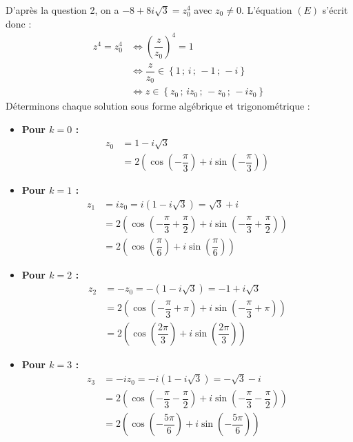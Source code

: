 \documentclass[12pt,a4paper]{article}
\begin{document}
\begin{enumerate}
    D'après la question 2, on a $-8 + 8i\sqrt{3} = z_0^4$ avec $z_0 \neq 0$. L'équation $(E)$ s'écrit donc :
    $$
    \begin{aligned}
        z^4 = z_0^4 &\iff \left(\dfrac{z}{z_0}\right)^4 = 1 \\
        &\iff \dfrac{z}{z_0} \in \left\{ 1 \,;\, i \,;\, -1 \,;\, -i \right\} \\
        &\iff z \in \left\{ z_0 \,;\, iz_0 \,;\, -z_0 \,;\, -iz_0 \right\}
    \end{aligned}
    $$
    Déterminons chaque solution sous forme algébrique et trigonométrique :
    \begin{itemize}
        \item \textbf{Pour $k = 0$ :}
        $$
        \begin{aligned}
            z_0 &= 1 - i\sqrt{3} \\
            &= 2\left(\cos\left(-\dfrac{\pi}{3}\right) + i\sin\left(-\dfrac{\pi}{3}\right)\right)
        \end{aligned}
        $$
        \item \textbf{Pour $k = 1$ :}
        $$
        \begin{aligned}
            z_1 &= iz_0 = i(1 - i\sqrt{3}) = \sqrt{3} + i \\
            &= 2\left(\cos\left(-\dfrac{\pi}{3} + \dfrac{\pi}{2}\right) + i\sin\left(-\dfrac{\pi}{3} + \dfrac{\pi}{2}\right)\right) \\
            &= 2\left(\cos\left(\dfrac{\pi}{6}\right) + i\sin\left(\dfrac{\pi}{6}\right)\right)
        \end{aligned}
        $$
        \item \textbf{Pour $k = 2$ :}
        $$
        \begin{aligned}
            z_2 &= -z_0 = -(1 - i\sqrt{3}) = -1 + i\sqrt{3} \\
            &= 2\left(\cos\left(-\dfrac{\pi}{3} + \pi\right) + i\sin\left(-\dfrac{\pi}{3} + \pi\right)\right) \\
            &= 2\left(\cos\left(\dfrac{2\pi}{3}\right) + i\sin\left(\dfrac{2\pi}{3}\right)\right)
        \end{aligned}
        $$
        \item \textbf{Pour $k = 3$ :}
        $$
        \begin{aligned}
            z_3 &= -iz_0 = -i(1 - i\sqrt{3}) = -\sqrt{3} - i \\
            &= 2\left(\cos\left(-\dfrac{\pi}{3} - \dfrac{\pi}{2}\right) + i\sin\left(-\dfrac{\pi}{3} - \dfrac{\pi}{2}\right)\right) \\
            &= 2\left(\cos\left(-\dfrac{5\pi}{6}\right) + i\sin\left(-\dfrac{5\pi}{6}\right)\right)
        \end{aligned}
        $$
    \end{itemize}
\end{enumerate}
\end{document}
